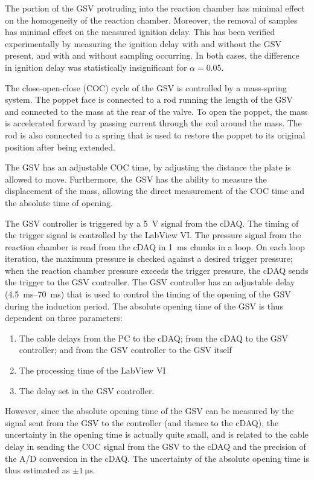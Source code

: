 \documentclass[../main.tex]{subfiles}
\begin{document}
The portion of the GSV protruding into the reaction chamber has minimal
effect on the homogeneity of the reaction chamber. Moreover, the removal of
samples has minimal effect on the measured ignition delay.
This has been verified experimentally by measuring the ignition delay with
and without the GSV present, and with and without sampling occurring.
In both cases, the difference in ignition delay was statistically insignificant
for $\alpha=0.05$.

The close-open-close (COC) cycle of the GSV is controlled by a mass-spring
system. The poppet face is connected to a rod running the length of the
GSV and connected to the mass at the rear of the valve. To open the poppet,
the mass is accelerated forward by passing current through the coil around
the mass. The rod is also
connected to a spring that is used to restore the poppet to its original
position after being extended.

The GSV has an adjustable COC time, by adjusting the
distance the plate is allowed to move. Furthermore, the GSV has the ability
to measure the displacement of the mass, allowing the direct measurement of
the COC time and the absolute time of opening.

The GSV controller is triggered by a \SI{5}{\volt} signal from the cDAQ.
The timing of the trigger signal is controlled by the LabView VI. The pressure
signal from the reaction chamber is read from the cDAQ in \SI{1}{\milli\second}
chunks in a loop. On each loop iteration, the maximum pressure is checked
against a desired trigger pressure; when the reaction chamber pressure exceeds
the trigger pressure, the cDAQ sends the trigger to the GSV controller. The
GSV controller has an adjustable delay (\SIrange{4.5}{70}{\milli\second}) that
is used to control the timing of the opening of the GSV during the induction period.
The absolute opening time of the GSV is thus dependent on three parameters:
\begin{enumerate}
\item The cable delays from the PC to the cDAQ; from the cDAQ to the GSV
      controller; and from the GSV controller to the GSV itself
\item The processing time of the LabView VI
\item The delay set in the GSV controller.
\end{enumerate}

However, since the absolute opening time of the GSV can be measured by
the signal sent from the GSV to the controller (and thence to the cDAQ),
the uncertainty in the opening time is actually quite small, and is related
to the cable delay in sending the COC signal from the GSV to the cDAQ and
the precision of the A/D conversion in the cDAQ. The uncertainty of the
absolute opening time is thus estimated as $\pm \SI{1}{\micro\second}$. 
\end{document}
